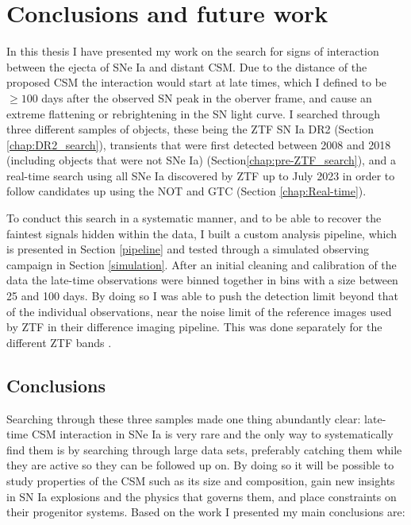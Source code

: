 \documentclass[a4paper,oneside,12pt, class=Latex/Classes/PhDthesisPSnPDF, crop=false]{standalone}
\begin{document}
\doublespacing
\chapter{Conclusions and future work}
\label{chap:Conc_and_fut}


In this thesis I have presented my work on the search for signs of interaction between the ejecta of SNe Ia and distant CSM. Due to the distance of the proposed CSM the interaction would start at late times, which I defined to be $\geq100$ days after the observed SN peak in the oberver frame, and cause an extreme flattening or rebrightening in the SN light curve. I searched through three different samples of objects, these being the ZTF SN Ia DR2 (Section \ref{chap:DR2_search}), transients that were first detected between 2008 and 2018 (including objects that were not SNe Ia) (Section\ref{chap:pre-ZTF_search}), and a real-time search using all SNe Ia discovered by ZTF up to July 2023 in order to follow candidates up using the NOT and GTC (Section \ref{chap:Real-time}).

To conduct this search in a systematic manner, and to be able to recover the faintest signals hidden within the data, I built a custom analysis pipeline, which is presented in Section \ref{pipeline} and tested through a simulated observing campaign in Section \ref{simulation}. After an initial cleaning and calibration of the data the late-time observations were binned together in bins with a size between 25 and 100 days. By doing so I was able to push the detection limit beyond that of the individual observations, near the noise limit of the reference images used by ZTF in their difference imaging pipeline. This was done separately for the different ZTF bands \ztfg\ztfr\ztfi.


\section{Conclusions}
Searching through these three samples made one thing abundantly clear: late-time CSM interaction in SNe Ia is very rare and the only way to systematically find them is by searching through large data sets, preferably catching them while they are active so they can be followed up on. By doing so it will be possible to study properties of the CSM such as its size and composition, gain new insights in SN Ia explosions and the physics that governs them, and place constraints on their progenitor systems. Based on the work I presented my main conclusions are:
\end{document}
